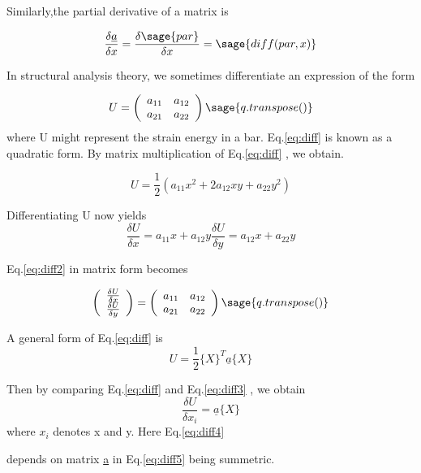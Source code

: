\documentclass[12pt]{report}
\newcommand{\lab}[1]{
	Eq.\ref{#1}
}
\begin{document}
Similarly,the partial derivative of a matrix is 

\begin{equation} 
	\frac{\delta\underline{a}}{\delta x}= \frac{\delta \sage{par} 
    }{\delta x} = \sage{diff(par,x)} 
\end{equation}

In structural analysis theory, 
we sometimes differentiate an expression of the form 

\begin{equation}
	U =\left(\begin{array}{rr}a_{11} & a_{12}\\
	a_{21} & a_{22}\\ 
	\end{array}\right)\sage{q.transpose()}
\label{eq:diff}
\end{equation}
where U might represent the strain energy in 
a bar.\lab{eq:diff} is known as a quadratic 
form. By matrix multiplication of \lab{eq:diff}, 
we obtain.

\begin{equation} 
	U = \frac{1}{2}(a_{{11}}x^2 +2a_{{12}}xy + a_{{22}}y^2)
\end{equation}

Differentiating U now yields 
\begin{equation} 
	\frac{\delta U}{\delta x} = a_{{11}}x + a_{{12}}y  \frac{\delta U}{\delta y} = a_{{12}}x + a_{{22}}y 
	\label{eq:diff2}
	\end{equation} 
	\lab{eq:diff2} in matrix form becomes

\begin{equation}
	\left(\begin{array}{rr} \frac{\delta U}{\delta x} \\
	\frac{\delta U}{\delta y} \\ 
	\end{array}\right) = \left(\begin{array}{rr}a_{11} & a_{12} \\
	a_{21} & a_{22}\\ 
	\end{array}\right) \sage{q.transpose()}\label{eq:diff3}
\end{equation}

A general form of \lab{eq:diff} is 
\begin{equation} 
	U = \frac{1}{2}\{X\}^T\underline{a}\{X\}
	\label{eq:diff5}
\end{equation}

Then by comparing \lab{eq:diff} and \lab{eq:diff3}, we obtain 
\begin{equation}
	\frac{ \delta U}{\delta x_{i}} = \underline{a}\{X\}
	\label{eq:diff4}
\end{equation}
where $x_{i}$ denotes x and y. Here \lab{eq:diff4} 
depends on matrix \underline{a} in \lab{eq:diff5}being summetric.
\end{document}
